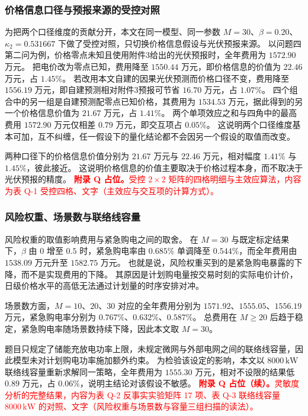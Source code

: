\subsubsection{价格信息口径与预报来源的受控对照}

为把两个口径维度的贡献分开，本文在同一模型、同一参数 \(M=30\)、\(\beta=0.20\)、\(\kappa_2=0.531667\) 下做了受控对照，只切换价格信息假设与光伏预报来源。
以问题四第二问为例，价格零点未知且使用附件3给出的光伏预报时，全年费用为 \(1572.90\) 万元。
把电价改为零点已知，费用降至 \(1550.44\) 万元，即价格信息的价值为 \(22.46\) 万元，占 \(1.45\%\)。
若改用本文自建的因果光伏预测而价格口径不变，费用降至 \(1556.19\) 万元，即自建预测相对附件3预报可节省 \(16.70\) 万元，占 \(1.07\%\)。
四个组合中的另一组是自建预测配零点已知价格，其费用为 \(1534.53\) 万元，据此得到的另一个价格信息价值为 \(21.67\) 万元，占 \(1.41\%\)。
两个单项效应之和与四角中的最高费用 \(1572.90\) 万元仅相差 \(0.79\) 万元，即交互项占 \(0.05\%\)。
这说明两个口径维度基本可加，互不纠缠，任一假设下的量化结论都不会因另一个假设的取值而改变。

两种口径下的价格信息价值分别为 \(21.67\) 万元与 \(22.46\) 万元，相对幅度 \(1.41\%\) 与 \(1.45\%\)，彼此接近。
这说明价格信息的价值主要取决于价格过程本身，而不取决于光伏预报的精度。
\textcolor{red}{\textbf{附录 Q 占位。}受控 \(2\times2\) 矩阵的四格明细与主效应算法，内容为表 Q-1 受控四格、文字（主效应与交互项的计算方式）。}

\subsubsection{风险权重、场景数与联络线容量}

风险权重的取值影响费用与紧急购电之间的取舍。
在 \(M=30\) 与既定标定结果下，\(\beta\) 由 \(0\) 增至 \(0.5\) 时，紧急购电率由 \(0.685\%\) 单调降至 \(0.544\%\)，而全年费用由 \(1538.09\) 万元升至 \(1582.75\) 万元。
也就是说，风险权重买到的是紧急购电暴露的下降，而不是实现费用的下降。
其原因是计划购电量按交易时刻的实际电价计价，日级价格水平的高低无法通过计划量的时序安排对冲。

场景数方面，\(M=10\)、\(20\)、\(30\) 对应的全年费用分别为 \(1571.92\)、\(1555.05\)、\(1556.19\) 万元，紧急购电率分别为 \(0.767\%\)、\(0.632\%\)、\(0.587\%\)。
总费用在 \(M\ge20\) 后趋于稳定，紧急购电率随场景数持续下降，因此本文取 \(M=30\)。

题目只规定了储能充放电功率上限，未规定微网与外部电网之间的联络线容量，因此模型未对计划购电功率施加额外约束。
为检验该设定的影响，本文以 \(8000\,\mathrm{kW}\) 联络线容量重新求解同一策略，全年费用为 \(1555.30\) 万元，相对不设限的结果低 \(0.89\) 万元，占 \(0.06\%\)，说明主结论对该假设不敏感。
\textcolor{red}{\textbf{附录 Q 占位（续）。}灵敏度分析的完整结果，内容为表 Q-2 反事实实验矩阵 17 项、表 Q-3 联络线容量 \(8000\,\mathrm{kW}\) 的对照、文字（风险权重与场景数与容量三组扫描的读法）。}

